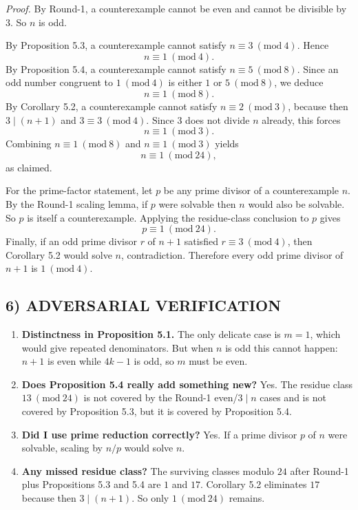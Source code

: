 \emph{Proof.}
By Round-1, a counterexample cannot be even and cannot be divisible by $3$. So $n$ is odd.

By Proposition 5.3, a counterexample cannot satisfy $n\equiv 3 \ (\mathrm{mod}\ 4)$. Hence
\[
 n\equiv 1 \ (\mathrm{mod}\ 4).
\]
By Proposition 5.4, a counterexample cannot satisfy $n\equiv 5 \ (\mathrm{mod}\ 8)$. Since an odd number congruent to $1 \ (\mathrm{mod}\ 4)$ is either $1$ or $5 \ (\mathrm{mod}\ 8)$, we deduce
\[
 n\equiv 1 \ (\mathrm{mod}\ 8).
\]
By Corollary 5.2, a counterexample cannot satisfy $n\equiv 2 \ (\mathrm{mod}\ 3)$, because then $3\mid (n+1)$ and $3\equiv 3 \ (\mathrm{mod}\ 4)$. Since $3$ does not divide $n$ already, this forces
\[
 n\equiv 1 \ (\mathrm{mod}\ 3).
\]
Combining $n\equiv 1 \ (\mathrm{mod}\ 8)$ and $n\equiv 1 \ (\mathrm{mod}\ 3)$ yields
\[
 n\equiv 1 \ (\mathrm{mod}\ 24),
\]
as claimed.

For the prime-factor statement, let $p$ be any prime divisor of a counterexample $n$. By the Round-1 scaling lemma, if $p$ were solvable then $n$ would also be solvable. So $p$ is itself a counterexample. Applying the residue-class conclusion to $p$ gives
\[
 p\equiv 1 \ (\mathrm{mod}\ 24).
\]
Finally, if an odd prime divisor $r$ of $n+1$ satisfied $r\equiv 3 \ (\mathrm{mod}\ 4)$, then Corollary 5.2 would solve $n$, contradiction. Therefore every odd prime divisor of $n+1$ is $1 \ (\mathrm{mod}\ 4)$.

\subsection*{6) ADVERSARIAL VERIFICATION}
\begin{enumerate}
\item \textbf{Distinctness in Proposition 5.1.} The only delicate case is $m=1$, which would give repeated denominators. But when $n$ is odd this cannot happen: $n+1$ is even while $4k-1$ is odd, so $m$ must be even.
\item \textbf{Does Proposition 5.4 really add something new?} Yes. The residue class $13 \ (\mathrm{mod}\ 24)$ is not covered by the Round-1 even/$3\mid n$ cases and is not covered by Proposition 5.3, but it is covered by Proposition 5.4.
\item \textbf{Did I use prime reduction correctly?} Yes. If a prime divisor $p$ of $n$ were solvable, scaling by $n/p$ would solve $n$.
\item \textbf{Any missed residue class?} The surviving classes modulo $24$ after Round-1 plus Propositions 5.3 and 5.4 are $1$ and $17$. Corollary 5.2 eliminates $17$ because then $3\mid (n+1)$. So only $1 \ (\mathrm{mod}\ 24)$ remains.
\end{enumerate}

